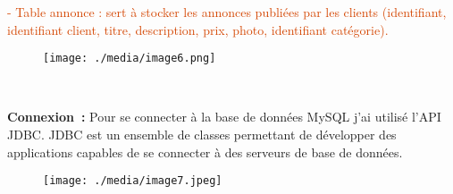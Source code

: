 \documentclass[12pt]{report}
\begin{document}
\begin{justify}
\textcolor[HTML]{D44501}{- Table annonce : sert à stocker les annonces publiées par les clients (identifiant, identifiant client, titre, description, prix, photo, identifiant catégorie). }
\end{justify}\par




\begin{figure}[H]
	\begin{Center}
		\texttt{[image: ./media/image6.png]}
	\end{Center}
\end{figure}



\begin{justify}
\textcolor[HTML]{D44501}{\ \ \ \ \ \ \ \ \ \ \ \ \ \ \ \ \ \ \ \ \ \ \ \ \ \ \ \ \ \ \ \ \ \ \ \ \ \ \ \ \ \ \  }
\end{justify}\par


\vspace{\baselineskip}
\begin{justify}
\textbf{Connexion :}\textit{ }Pour se connecter à la base de données MySQL j’ai utilisé l'API JDBC. JDBC est un ensemble de classes permettant de développer des applications capables de se connecter à des serveurs de base de données.
\end{justify}\par




\begin{figure}[H]
\advance\leftskip 2.41in		\texttt{[image: ./media/image7.jpeg]}
\end{figure}



\par


\vspace{\baselineskip}
\setlength{\parskip}{9.96pt}
\ \ \ \ \ \  \par


\vspace{\baselineskip}
\end{document}
